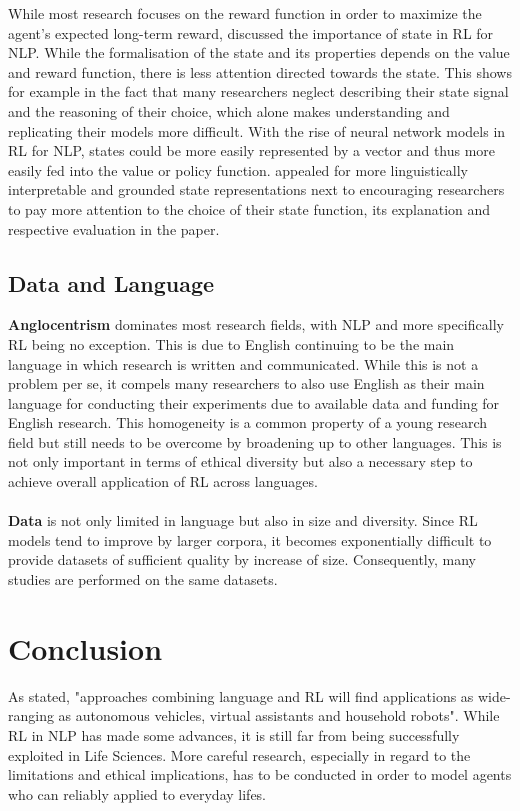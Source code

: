 \documentclass[11pt,a4paper]{article}
\begin{document}
While most research focuses on the reward function in order to maximize the agent's expected long-term reward, \citet{madureira2020} discussed the importance of state in RL for NLP. While the formalisation of the state and its properties depends on the value and reward function, there is less attention directed towards the state. This shows for example in the fact that many researchers neglect describing their state signal and the reasoning of their choice, which alone makes understanding and replicating their models more difficult. With the rise of neural network models in RL for NLP, states could be more easily represented by a vector and thus more easily fed into the value or policy function. \citet{madureira2020} appealed for more linguistically interpretable and grounded state representations next to encouraging researchers to pay more attention to the choice of their state function, its explanation and respective evaluation in the paper.

\subsection{Data and Language}
\textbf{Anglocentrism} dominates most research fields, with NLP and more specifically RL being no exception. This is due to English continuing to be the main language in which research is written and communicated. While this is not a problem per se, it compels many researchers to also use English as their main language for conducting their experiments due to available data and funding for English research. This homogeneity is a common property of a young research field but still needs to be overcome by broadening up to other languages. This is not only important in terms of ethical diversity but also a necessary step to achieve overall application of RL across languages. \\\\
\textbf{Data} is not only limited in language but also in size and diversity. Since RL models tend to improve by larger corpora, it becomes exponentially difficult to provide datasets of sufficient quality by increase of size. Consequently, many studies are performed on the same datasets.


\section{Conclusion}
As  \citet{ijcai2019} stated, "approaches combining language and RL will find applications as wide-ranging as autonomous vehicles, virtual assistants and household robots". While RL in NLP has made some advances, it is still far from being successfully exploited in Life Sciences. More careful research, especially in regard to the limitations and ethical implications, has to be conducted in order to model agents who can reliably applied to everyday lifes. 

\newpage

\end{document}
